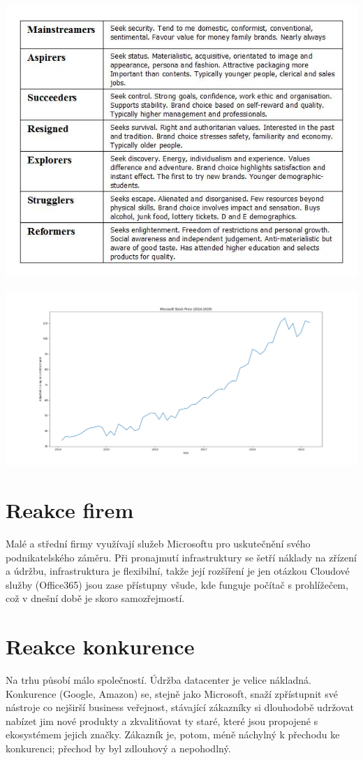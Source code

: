 \documentclass{article}
\begin{document}
\includegraphics[width=\linewidth]{cross_cultural_consumer_characterization.jpg}

\includegraphics[width=\linewidth]{stock_price_2014_2019.png}


\section{Reakce firem}
Malé a střední firmy využívají služeb Microsoftu pro uskutečnění svého podnikatelského záměru. Při pronajmutí infrastruktury se šetří náklady na zřízení a údržbu, infrastruktura je flexibilní, takže její rozšíření je jen otázkou  Cloudové služby (Office365) jsou zase přístupny všude, kde funguje počítač s prohlížečem, což v dnešní době je skoro samozřejmostí.

\section{Reakce konkurence}
Na trhu působí málo společností. Údržba datacenter je velice nákladná. Konkurence (Google, Amazon) se, stejně jako Microsoft, snaží zpřístupnit své nástroje co nejširší business veřejnost, stávající zákazníky si dlouhodobě udržovat nabízet jim nové produkty a zkvalitňovat ty staré, které jsou propojené s ekosystémem jejich značky. Zákazník je, potom, méně náchylný k přechodu ke konkurenci; přechod by byl zdlouhový a nepohodlný.
\end{document}
